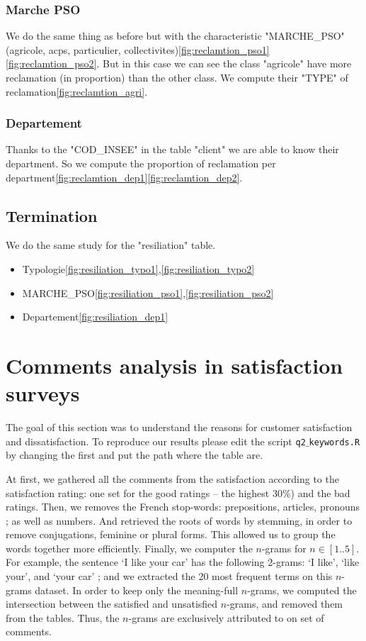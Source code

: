 \documentclass[a4paper, 11pt]{article}
\newcommand{\tw}[1]{\texttt{#1}}
\begin{document}
       \subsubsection{Marche PSO}
       		We do the same thing as before but with the characteristic "MARCHE\_PSO" (agricole, acps, particulier, collectivites)\ref{fig:reclamtion_pso1}\ref{fig:reclamtion_pso2}. But in this case we can see the class "agricole" have more reclamation (in proportion) than the other class. We compute their "TYPE" of reclamation\ref{fig:reclamtion_agri}. 
            
       \subsubsection{Departement}
       		Thanks to the "COD\_INSEE" in the table "client" we are able to know their department. So we compute the proportion of reclamation per department\ref{fig:reclamtion_dep1}\ref{fig:reclamtion_dep2}. 
            
       \subsection{Termination}
       		We do the same study for the "resiliation" table.
            \begin{itemize}
            \item Typologie\ref{fig:resiliation_typo1},\ref{fig:resiliation_typo2}
            \item MARCHE\_PSO\ref{fig:resiliation_pso1},\ref{fig:resiliation_pso2}
            \item Departement\ref{fig:resiliation_dep1}
            \end{itemize}

\section{Comments analysis in satisfaction surveys}
\label{sec:com_anal}
    The goal of this section was to understand the reasons for customer satisfaction and dissatisfaction. To reproduce our results please edit the script \tw{q2$\_$keywords.R} by changing the first and put the path where the table are.

    At first, we gathered all the comments from the satisfaction according to the satisfaction rating: one set for the good ratings -- the highest 30\%) and the bad ratings.
    Then, we removes the French stop-words: prepositions, articles, pronouns ; as well as numbers. And retrieved the roots of words by stemming, in order to remove conjugations, feminine or plural forms. This allowed us to group the words together more efficiently.
    Finally, we computer the $n$-grams for $n \in [1..5]$. For example, the sentence `I like your car' has the following 2-grams: `I like', `like your', and `your car' ;
    and we extracted the 20 most frequent terms on this $n$-grams dataset.
    In order to keep only the meaning-full $n$-grams, we computed the intersection between the satisfied and unsatisfied $n$-grams, and removed them from the tables. Thus, the $n$-grams are exclusively attributed to on set of comments.
\end{document}
